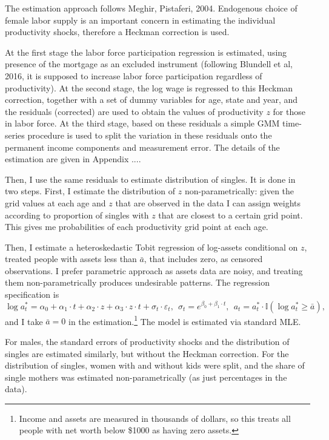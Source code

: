 \documentclass[12pt,letter]{article}
\newcommand{\I}{\mathbb{I}}
\begin{document}
The estimation approach follows Meghir, Pistaferi, 2004\nocite{meghir2004income}. Endogenous choice of female labor supply is an important concern in estimating the individual productivity shocks, therefore a Heckman correction is used.

At the first stage the labor force participation regression is estimated, using presence of the mortgage as an excluded instrument (following Blundell et al, 2016\nocite{blundell2016consumption}, it is supposed to increase labor force participation regardless of productivity). At the second stage, the log wage is regressed to this Heckman correction, together with a set of dummy variables for age, state and year, and the residuals (corrected) are used to obtain the values of productivity $z$ for those in labor force. At the third stage, based on these residuals a simple GMM time-series procedure is used to split the variation in these residuals onto the permanent income components and measurement error. The details of the estimation are given in Appendix .... 

Then, I use the same residuals to estimate distribution of singles. It is done in two steps. First, I estimate the distribution of $z$ non-parametrically: given the grid values at each age and $z$ that are observed in the data I can assign weights according to proportion of singles with $z$ that are closest to a certain grid point. This gives me probabilities of each productivity grid point at each age.

Then, I estimate a heteroskedastic Tobit regression of log-assets conditional on $z$, treated people with assets less than $\bar{a}$, that includes zero, as censored observations. I prefer parametric approach as assets data are noisy, and treating them non-parametrically produces undesirable patterns.  The regression specification is
\begin{equation}\label{tobit-partner}
\log a_t^* = \alpha_0 + \alpha_1\cdot t + \alpha_2 \cdot z + \alpha_3 \cdot z\cdot t + \sigma_t \cdot \varepsilon_t, \ \ \sigma_t = e^{\beta_0 + \beta_1\cdot t}, \ \ a_t = a_t^* \cdot \I(\log a_t^* \geq \bar{a}),
\end{equation}
and I take $\bar{a} = 0$ in the estimation.\footnote{Income and assets are measured in thousands of dollars, so this treats all people with net worth below \$1000 as having zero assets.} The model is estimated via standard MLE.

For males, the standard errors of productivity shocks and the distribution of singles are estimated similarly, but without the Heckman correction. For the distribution of singles, women with and without kids were split, and the share of single mothers was estimated non-parametrically (as just percentages in the data). 
\end{document}
